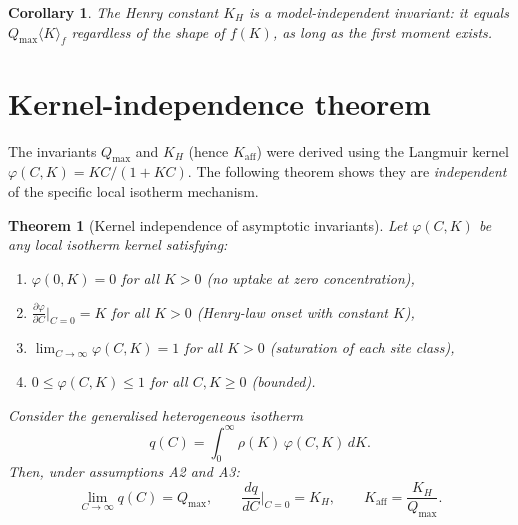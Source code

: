 \documentclass[12pt]{article}
\newtheorem{theorem}{Theorem}
\newtheorem{corollary}{Corollary}
\begin{document}
\begin{corollary}
The Henry constant $K_H$ is a model-independent invariant: it equals
$Q_{\max}\langle K\rangle_f$ regardless of the shape of $f(K)$,
as long as the first moment exists.
\end{corollary}

\section{Kernel-independence theorem}
\label{sec:kernel}

The invariants $Q_{\max}$ and $K_H$ (hence $K_{\mathrm{aff}}$) were
derived using the Langmuir kernel $\varphi(C,K)=KC/(1+KC)$.
The following theorem shows they are \emph{independent} of the
specific local isotherm mechanism.

\begin{theorem}[Kernel independence of asymptotic invariants]
\label{thm:kernel}
Let $\varphi(C,K)$ be \emph{any} local isotherm kernel satisfying:
\begin{enumerate}[nosep]
  \item[(K1)] $\varphi(0,K)=0$ for all $K>0$
        \quad (no uptake at zero concentration),
  \item[(K2)] $\displaystyle\frac{\partial\varphi}{\partial C}
        \bigg|_{C=0}=K$ for all $K>0$
        \quad (Henry-law onset with constant $K$),
  \item[(K3)] $\displaystyle\lim_{C\to\infty}\varphi(C,K)=1$
        for all $K>0$
        \quad (saturation of each site class),
  \item[(K4)] $0\le\varphi(C,K)\le 1$ for all $C,K\ge 0$
        \quad (bounded).
\end{enumerate}
Consider the generalised heterogeneous isotherm
\begin{equation}
  q(C)=\int_0^\infty\rho(K)\,\varphi(C,K)\,dK.
  \label{eq:general_kernel}
\end{equation}
Then, under assumptions A2 and A3:
\begin{equation}
  \lim_{C\to\infty}q(C)=Q_{\max},\qquad
  \frac{dq}{dC}\bigg|_{C=0}=K_H,\qquad
  K_{\mathrm{aff}}=\frac{K_H}{Q_{\max}}.
  \label{eq:kernel_indep}
\end{equation}
\end{theorem}
\end{document}
